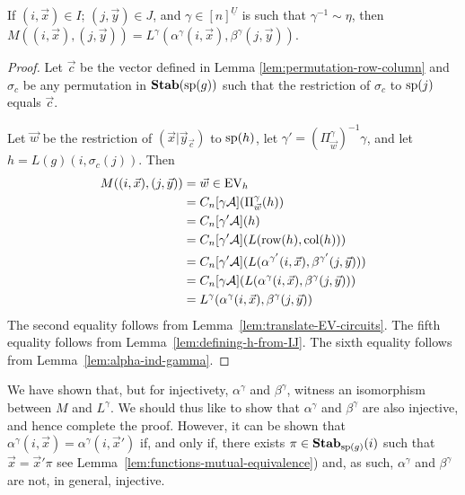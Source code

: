 \documentclass[../main/thesis.tex]{subfiles}
\begin{document}
\begin{thm}
  If $(i, \vec{x})\in I$; $(j, \vec{y})\in J$, and $\gamma\in
  [n]^{\underline{U}}$ is such that $ \gamma^{-1} \sim \eta$, then
  $M((i,\vec{x}), (j, \vec{y})) = L^{\gamma}(\alpha^{\gamma}(i, \vec{x}),
  \beta^{\gamma}(j, \vec{y}))$.
	\label{lem:ML-equal-elements}
\end{thm}
\begin{proof}
	Let $\vec{c}$ be the vector defined in Lemma \ref{lem:permutation-row-column}
  and $\sigma_c$ be any permutation in $\text{\textbf{Stab}} (\text{sp} (g))$ such that the restriction of
  $\sigma_c$ to $\text{sp}(j)$ equals $\vec{c}$.
  
  Let $\vec{w}$ be the restriction of $(\vec{x} \vert \vec{y}_{\vec{c}})$ to
  $\text{sp}(h)$, let $\gamma' = (\Pi^{\gamma}_{\vec{w}})^{-1} \gamma$, and let $h
  = L(g)(i, \sigma_c(j))$. Then
	\begin{align*}
		M((i, \vec{x}), (j, \vec{y}))
    & = \vec{w} \in \text{EV}_h                                    \\
    & = C_n[\gamma \mathcal{A}] (\Pi^{\gamma}_{\vec{w}} (h)) \\
    & = C_n[\gamma' \mathcal{A}] (h)                                                             \\
    & = C_n[\gamma' \mathcal{A}](L(\text{row}(h), \text{col} (h)))                                        \\
    & = C_n[\gamma' \mathcal{A}](L(\alpha^{\gamma'}(i, \vec{x}), \beta^{\gamma'}(j, \vec{y})))   \\
    & = C_n[\gamma \mathcal{A}](L(\alpha^{\gamma}(i, \vec{x}), \beta^{\gamma}(j, \vec{y})))     \\
    & = L^{\gamma}(\alpha^{\gamma}(i, \vec{x}), \beta^{\gamma}(j, \vec{y}))                      
	\end{align*}
	The second equality follows from Lemma~\ref{lem:translate-EV-circuits}. The
  fifth equality follows from Lemma~\ref{lem:defining-h-from-IJ}. The sixth
  equality follows from Lemma~\ref{lem:alpha-ind-gamma}.
\end{proof}

We have shown that, but for injectivety, $\alpha^{\gamma}$ and $\beta^{\gamma}$,
witness an isomorphism between $M$ and $L^{\gamma}$. We should thus like to show
that $\alpha^{\gamma}$ and $\beta^{\gamma}$ are also injective, and hence
complete the proof. However, it can be shown that $\alpha^{\gamma}(i, \vec{x}) =
\alpha^{\gamma}(i, \vec{x}')$ if, and only if, there exists $\pi \in
\text{\textbf{Stab}}_{\text{sp}(g)}(i)$ such that $\vec{x} = \vec{x}'\pi$ see
Lemma~\ref{lem:functions-mutual-equivalence}) and, as such, $\alpha^{\gamma}$
and $\beta^{\gamma}$ are not, in general, injective.
\end{document}
